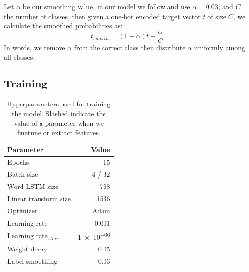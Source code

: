 \documentclass[11pt]{article}
\newcommand\citep{\cite}
\begin{document}
         Let $\alpha$ be our smoothing value, in our model we follow
     \citep{kondratyukstraka} and use $\alpha = 0.03$, and $C$ the
     number of classes, then given a one-hot encoded target vector $t$
     of size $C$, we calculate the smoothed probabilities as:
    \begin{equation}
        t_{smooth} = (1-\alpha)t + \frac{\alpha}{C}
    \end{equation}
    In words, we remove $\alpha$ from the correct class then
    distribute $\alpha$ uniformly among all classes.


    \subsection{Training}

            \begin{table}
		\centering
		\begin{tabular}{lr} \\
			Parameter & Value \\
			\hline
			Epochs & 15 \\
			Batch size & 4 / 32 \\
            Word LSTM size & 768 \\
            Linear transform size & 1536 \\
			Optimizer & Adam \\
			Learning rate & 0.001 \\
			Learning rate$_{xlmr}$ & \num{1e-06} \\
            Weight decay & 0.05 \\
			Label smoothing & 0.03 \\
		\end{tabular}
    		\caption{\label{tab:parameters} Hyperparameters used for
     training the model. Slashed indicate the value of a parameter
     when we finetune or extract features.}
	\end{table}
    
\end{document}
